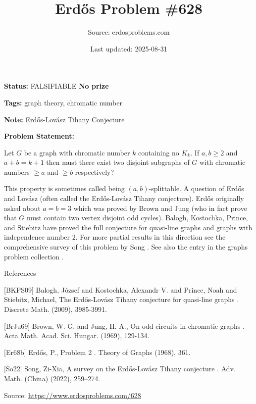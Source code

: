 \documentclass{article}
\title{Erd\H{o}s Problem \#628}
\date{Last updated: 2025-08-31}
\author{Source: erdosproblems.com}
\begin{document}
\maketitle

\noindent\textbf{Status:} FALSIFIABLE \quad \textbf{No prize}

\noindent\textbf{Tags:} graph theory, chromatic number

\medskip
\noindent\textbf{Note:} Erdős-Lovász Tihany Conjecture

\medskip

\noindent\textbf{Problem Statement:}

Let $G$ be a graph with chromatic number $k$ containing no $K_k$. If $a,b\geq 2$ and $a+b=k+1$ then must there exist two disjoint subgraphs of $G$ with chromatic numbers $\geq a$ and $\geq b$ respectively?




This property is sometimes called being $(a,b)$-splittable. A question of Erd\H{o}s and Lov\'{a}sz (often called the Erd\H{o}s-Lov\'{a}sz Tihany conjecture). Erd\H{o}s \cite{Er68b} originally asked about $a=b=3$ which was proved by Brown and Jung \cite{BrJu69} (who in fact prove that $G$ must contain two vertex disjoint odd cycles). Balogh, Kostochka, Prince, and Stiebitz \cite{BKPS09} have proved the full conjecture for quasi-line graphs and graphs with independence number $2$. For more partial results in this direction see the comprehensive survey of this problem by Song \cite{So22}. See also the entry in the graphs problem collection .




References

[BKPS09] Balogh, J\'{o}zsef and Kostochka, Alexandr V. and Prince, Noah and Stiebitz, Michael, The Erd\H{o}s-Lov\'{a}sz Tihany conjecture for quasi-line graphs . Discrete Math. (2009), 3985-3991.

[BrJu69] Brown, W. G. and Jung, H. A., On odd circuits in chromatic graphs . Acta Math. Acad. Sci. Hungar. (1969), 129-134.

[Er68b] Erd\H{o}s, P., Problem 2 . Theory of Graphs (1968), 361.

[So22] Song, Zi-Xia, A survey on the {E}rd\H{o}s-{L}ov\'{a}sz Tihany conjecture . Adv. Math. (China) (2022), 259--274.

\bigskip
\noindent\small{Source: \url{https://www.erdosproblems.com/628}}
\end{document}
